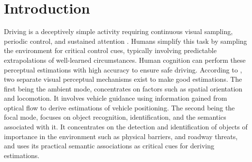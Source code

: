 \documentclass{article}
\begin{document}

\section{Introduction}\vspace{-10pt}
Driving is a deceptively simple activity requiring continuous visual sampling, periodic control, and sustained attention \cite{CASTRO}. Humans simplify this task by sampling the environment for critical control cues, typically involving predictable extrapolations of well-learned circumstances. Human cognition can perform these perceptual estimations with high accuracy to ensure safe driving. According to \cite{Tyrrell}, two separate visual perceptual mechanisms exist to make good estimations. The first being the ambient mode, concentrates on factors such as spatial orientation and locomotion. It involves vehicle guidance using information gained from optical flow to derive estimations of vehicle positioning. The second being the focal mode, focuses on object recognition, identification, and the semantics associated with it. It concentrates on the detection and identification of objects of importance in the environment such as physical barriers, and roadway threats, and uses its practical semantic associations as critical cues for deriving estimations. 
 
\end{document}
